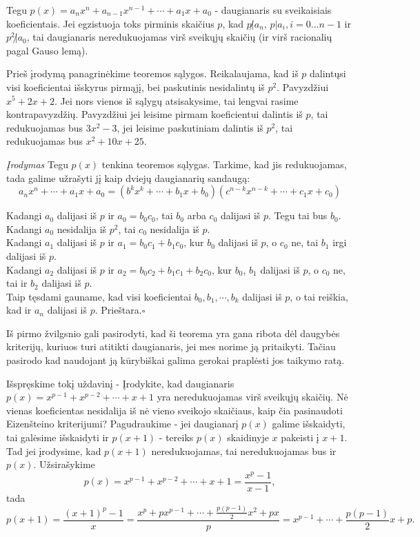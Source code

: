 \begin{thm} Tegu $p(x) = a_nx^n +
  a_{n-1}x^{n-1} + \cdots + a_1x+a_0$ - daugianaris su sveikaisiais
  koeficientais. Jei egzistuoja toks pirminis skaičius $p$, kad $p \not |
  a_n$, $p|a_i, i=0\dots n-1$ ir $p^2 \not | a_0$, tai daugianaris
  neredukuojamas virš sveikųjų skaičių (ir virš racionalių pagal Gauso
  lemą).  \end{thm}

Prieš įrodymą panagrinėkime teoremos sąlygos. Reikalaujama, kad iš $p$
dalintųsi visi koeficientai išskyrus pirmąjį, bei paskutinis nesidalintų iš
$p^2$. Pavyzdžiui $x^5 + 2x + 2$. Jei nors vienos iš sąlygų atsisakysime,
tai lengvai rasime kontrapavyzdžių. Pavyzdžiui jei leisime pirmam
koeficientui dalintis iš $p$, tai redukuojamas bus $3x^2 - 3$, jei leisime
paskutiniam dalintis iš $p^2$, tai redukuojamas bus $x^2 + 10x + 25$.

\emph{Įrodymas} Tegu $p(x)$ tenkina teoremos sąlygas. Tarkime, kad jis
redukuojamas, tada galime užrašyti jį kaip dviejų daugianarių sandaugą:
$$a_nx^n + \cdots + a_1x+a_0 = (b^kx^k + \cdots + b_1x +
b_0)(c^{n-k}x^{n-k} + \cdots + c_1x + c_0)$$

Kadangi $a_0$ dalijasi iš $p$ ir $a_0 = b_0c_0$, tai $b_0$ arba $c_0$
dalijasi iš $p$. Tegu tai bus $b_0$. Kadangi $a_0$ nesidalija iš $p^2$, tai
$c_0$ nesidalija iš $p$.\\ Kadangi $a_1$ dalijasi iš $p$ ir $a_1 = b_0c_1 +
b_1c_0$, kur $b_0$ dalijasi iš $p$, o $c_0$ ne, tai $b_1$ irgi dalijasi iš
$p$.\\ Kadangi $a_2$ dalijasi iš $p$ ir $a_2 = b_0c_2 + b_1c_1 + b_2c_0$,
kur $b_0$, $b_1$ dalijasi iš $p$, o $c_0$ ne, tai ir $b_2$ dalijasi iš
$p$.\\ Taip tęsdami gauname, kad visi koeficientai $b_0, b_1, \cdots, b_k$
dalijasi iš $p$, o tai reiškia, kad ir $a_n$ dalijasi iš $p$.
Prieštara.$\square$

Iš pirmo žvilgsnio gali pasirodyti, kad ši teorema yra gana ribota dėl
daugybės kriterijų, kuriuos turi atitikti daugianaris, jei mes norime ją
pritaikyti. Tačiau pasirodo kad naudojant ją kūrybiškai galima gerokai
praplėsti jos taikymo ratą.

Išspręskime tokį uždavinį - Įrodykite, kad daugianaris $p(x) = x^{p-1} +
x^{p-2} + \cdots + x + 1$ yra neredukuojamas virš sveikųjų skaičių. Nė
vienas koeficientas nesidalija iš nė vieno sveikojo skaičiaus, kaip čia
pasinaudoti Eizenšteino kriterijumi? Pagudraukime - jei daugianarį $p(x)$
galime išskaidyti, tai galėsime išskaidyti ir $p(x+1)$ - tereiks $p(x)$
skaidinyje $x$ pakeisti į $x+1$. Tad jei įrodysime, kad $p(x+1)$
neredukuojamas, tai neredukuojamas bus ir $p(x)$. Užsirašykime $$p(x) =
x^{p-1} + x^{p-2} + \cdots + x + 1 = \frac{x^p - 1}{x-1},$$ tada $$p(x+1) =
\frac{(x+1)^p - 1}{x} = \frac{x^p + px^{p-1} + \cdots + \frac{p(p-1)}{2}
x^2 + px}{p} = x^{p-1} + \cdots + \frac{p(p-1)}{2} x + p.$$

